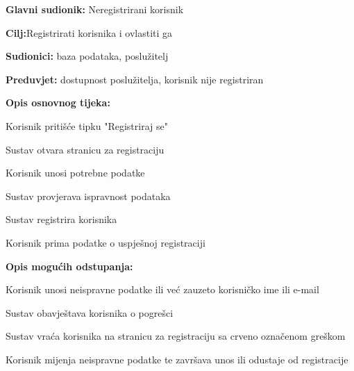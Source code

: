 \noindent {}
\begin{packed_item}
	
	\item \textbf{Glavni sudionik: }Neregistrirani korisnik
	\item  \textbf{Cilj:}Registrirati korisnika i ovlastiti ga
	\item  \textbf{Sudionici:} baza podataka, poslužitelj
	\item  \textbf{Preduvjet:} dostupnost poslužitelja, korisnik nije registriran
	\item  \textbf{Opis osnovnog tijeka:}
	
	\item[] \begin{packed_enum}
		
		\item Korisnik pritišće tipku "Registriraj se"
		\item Sustav otvara stranicu za registraciju
		\item Korisnik unosi potrebne podatke
		\item Sustav provjerava ispravnost podataka
		\item Sustav registrira korisnika
		\item Korisnik prima podatke o uspješnoj registraciji
		
	\end{packed_enum}
	
	\item  \textbf{Opis mogućih odstupanja:}
	
	\item[] \begin{packed_item}
		
		\item[2.a]Korisnik unosi neispravne podatke ili već zauzeto korisničko ime ili e-mail
		\item[] \begin{packed_enum}
			
			\item Sustav obavještava korisnika o pogrešci 
			\item Sustav vraća korisnika na stranicu za registraciju sa crveno označenom greškom
			\item Korisnik mijenja neispravne podatke te završava unos ili odustaje od registracije
			
		\end{packed_enum}
		
	\end{packed_item}
\end{packed_item}

